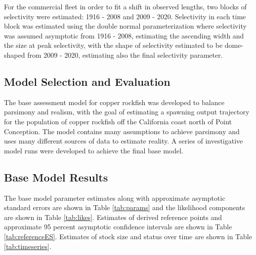 \documentclass[11pt,
  english,
  a4paper,
]{article}
\begin{document}
For the commercial fleet in order to fit a shift in observed lengths, two blocks of selectivity were estimated: 1916 - 2008 and 2009 - 2020. Selectivity in each time block was estimated using the double normal parameterization where selectivity was assumed asymptotic from 1916 - 2008, estimating the ascending width and the size at peak selectivity, with the shape of selectivity estimated to be dome-shaped from 2009 - 2020, estimating also the final selectivity parameter.

\leavevmode\tagmcend\tagstructend\par


\hypertarget{model-selection-and-evaluation}{%
\subsection{Model Selection and Evaluation}\label{model-selection-and-evaluation}}

\leavevmode\tagmcend\tagstructend


The base assessment model for copper rockfish was developed to balance parsimony and realism, with the goal of estimating a spawning output trajectory for the population of copper rockfish off the California coast north of Point Conception. The model contains many assumptions to achieve parsimony and uses many different sources of data to estimate reality. A series of investigative model runs were developed to achieve the final base model.

\leavevmode\tagmcend\tagstructend\par


\hypertarget{base-model-results}{%
\subsection{Base Model Results}\label{base-model-results}}

\leavevmode\tagmcend\tagstructend


The base model parameter estimates along with approximate asymptotic standard errors are shown in Table \ref{tab:params} and the likelihood components are shown in Table \ref{tab:likes}. Estimates of derived reference points and approximate 95 percent asymptotic confidence intervals are shown in Table \ref{tab:referenceES}. Estimates of stock size and status over time are shown in Table \ref{tab:timeseries}.
\end{document}
